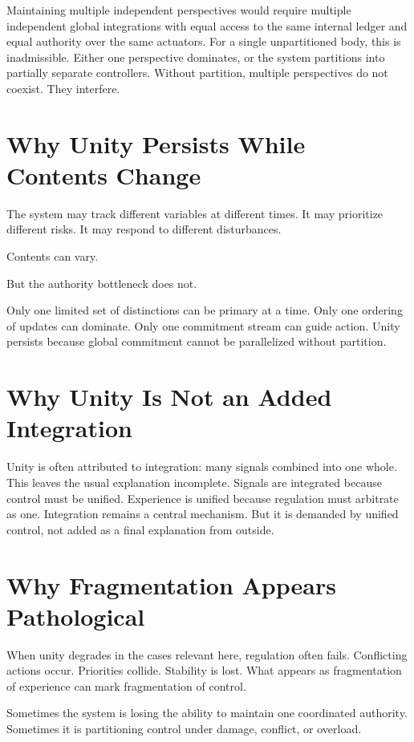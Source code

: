 \documentclass[11pt,twoside,openright]{book}
\begin{document}
Maintaining multiple independent perspectives would require multiple independent global integrations with equal access to the same internal ledger and equal authority over the same actuators. For a single unpartitioned body, this is inadmissible. Either one perspective dominates, or the system partitions into partially separate controllers. Without partition, multiple perspectives do not coexist. They interfere.

\section*{Why Unity Persists While Contents Change}

The system may track different variables at different times. It may prioritize different risks. It may respond to different disturbances.

Contents can vary.

But the authority bottleneck does not.

Only one limited set of distinctions can be primary at a time. Only one ordering of updates can dominate. Only one commitment stream can guide action. Unity persists because global commitment cannot be parallelized without partition.

\section*{Why Unity Is Not an Added Integration}

Unity is often attributed to integration: many signals combined into one whole. This leaves the usual explanation incomplete. Signals are integrated because control must be unified. Experience is unified because regulation must arbitrate as one. Integration remains a central mechanism. But it is demanded by unified control, not added as a final explanation from outside.

\section*{Why Fragmentation Appears Pathological}

When unity degrades in the cases relevant here, regulation often fails. Conflicting actions occur. Priorities collide. Stability is lost. What appears as fragmentation of experience can mark fragmentation of control.

Sometimes the system is losing the ability to maintain one coordinated authority. Sometimes it is partitioning control under damage, conflict, or overload.
\end{document}
